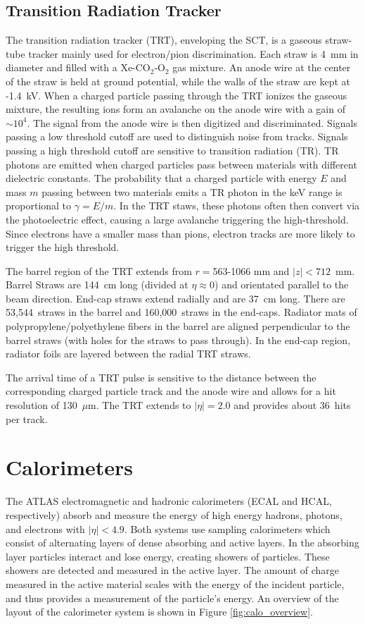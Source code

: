 \subsection{Transition Radiation Tracker}
The transition radiation tracker (TRT), enveloping the SCT, is a gaseous straw-tube tracker mainly used for electron/pion discrimination. Each straw is 4~mm in diameter and filled with a Xe-CO$_{2}$-O$_{2}$ gas mixture. An anode wire at the center of the straw is held at ground potential, while the walls of the straw are kept at -1.4~kV. When a charged particle passing through the TRT ionizes the gaseous mixture, the resulting ions form an avalanche on the anode wire with a gain of $\sim 10^{4}$. The signal from the anode wire is then digitized and discriminated. Signals passing a low threshold cutoff are used to distinguish noise from tracks. Signals passing a high threshold cutoff are sensitive to transition radiation (TR). TR photons are emitted when charged particles pass between materials with different dielectric constants. The probability that a charged particle with energy $E$ and mass $m$ passing between two materials emits a TR photon in the keV range is proportional to $\gamma=E/m$. In the TRT staws, these photons often then convert via the photoelectric effect, causing a large avalanche triggering the high-threshold. Since electrons have a smaller mass than pions, electron tracks are more likely to trigger the high threshold.

The barrel region of the TRT extends from $r=$563-1066 mm and $|z| < 712$~mm. Barrel Straws are 144~cm long (divided  at $\eta \approx 0$) and orientated parallel to the beam direction. End-cap straws extend radially and are 37~cm long. There are 53,544~straws in the barrel and 160,000~straws in the end-caps. Radiator mats of polypropylene/polyethylene fibers in the barrel are aligned perpendicular to the barrel straws (with holes for the straws to pass through). In the end-cap region, radiator foils are layered between the radial TRT straws. 

The arrival time of a TRT pulse is sensitive to the distance between the corresponding charged particle track and the anode wire and allows for a hit resolution of 130~$\mu$m. The TRT extends to $|\eta| = 2.0$ and provides about 36~hits per track.
\section{Calorimeters}
The ATLAS electromagnetic and hadronic calorimeters (ECAL and HCAL, respectively) absorb and measure the energy of high energy hadrons, photons, and electrons with $|\eta| < 4.9$. Both systems use sampling calorimeters which consist of alternating layers of dense absorbing and active layers. In the absorbing layer particles interact and lose energy, creating showers of particles. These showers are  detected and measured in the active layer. The amount of charge measured in the active material scales with the energy of the incident particle, and thus provides a measurement of the particle's energy. An overview of the layout of the calorimeter system is shown in Figure \ref{fig:calo_overview}.

